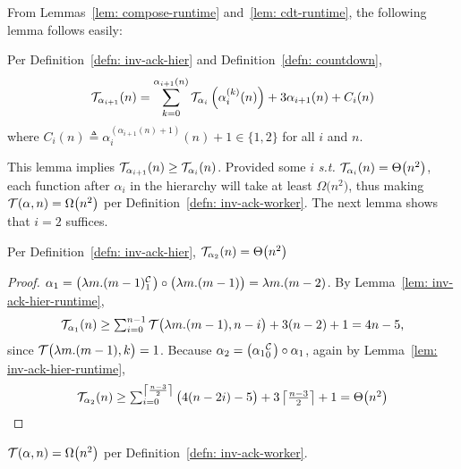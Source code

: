 \noindent From Lemmas~\ref{lem: compose-runtime} and~\ref{lem: cdt-runtime}, the following lemma follows easily:
\begin{lem} \label{lem: inv-ack-hier-runtime}
	Per Definition~\ref{defn: inv-ack-hier} and Definition~\ref{defn: countdown},
	\begin{equation*}
	\mathcal{T}_{\alpha_{i+1}}(n) = \sum_{k=0}^{\alpha_{i+1}(n)}\mathcal{T}_{\alpha_i}\left( \alpha_i^{(k)}(n)\right) + 3\alpha_{i+1}(n) + C_i(n)
	\end{equation*}
	where $C_i(n) \triangleq \alpha_i^{(\alpha_{i+1}(n) + 1)}(n) + 1 \in \{1, 2\}$ for all $i$ and $n$.
\end{lem}
This lemma implies $\mathcal{T}_{\alpha_{i+1}}(n) \ge \mathcal{T}_{\alpha_i}(n)$. Provided some $i$ \emph{s.t.} $\mathcal{T}_{\alpha_i}(n) = \Theta\big(n^2\big)$, each function after $\alpha_i$ in the hierarchy will take at least $\Omega\big(n^2\big)$, thus making $\mathcal{T}(\alpha, n) = \Omega\big(n^2\big)$ per Definition~\ref{defn: inv-ack-worker}. The next lemma shows that $i = 2$ suffices.
\begin{lem}
	Per Definition~\ref{defn: inv-ack-hier}, $\mathcal{T}_{\alpha_2}(n) = \Theta\big(n^2\big)$
\end{lem}
\begin{proof}
	$\alpha_1 = \big(\cdt{\lambda m.(m-1)}{1}\big)\circ \big(\lambda m.(m-1)\big) = \lambda m.(m - 2)$. By Lemma~\ref{lem: inv-ack-hier-runtime},
	\begin{equation*}
	\mathcal{T}_{\alpha_1}(n) \ge \textstyle \sum_{i=0}^{n-1} \mathcal{T}\big(\lambda m.(m-1), n - i\big) + 3(n - 2) + 1 = 4n - 5\text{,}
	\end{equation*}
	since $\mathcal{T}\big(\lambda m.(m-1), k\big) = 1$. Because $\alpha_2 = \big(\cdt{\alpha_1}{0}\big)\circ \alpha_1 $, again by Lemma~\ref{lem: inv-ack-hier-runtime},
	\begin{equation*}
	\mathcal{T}_{\alpha_2}(n)
	\ge \textstyle \sum_{i=0}^{\left\lceil \frac{n-3}{2} \right\rceil} \big(4(n-2i) - 5\big) + 3\left\lceil \frac{n-3}{2} \right\rceil + 1
	= \Theta\big(n^2\big)
	\end{equation*}
\end{proof}
\begin{col}
	$\mathcal{T}(\alpha, n) = \Omega\big(n^2\big)$ per Definition~\ref{defn: inv-ack-worker}.
\end{col}

